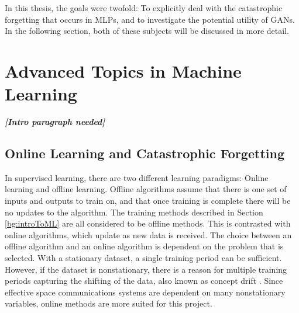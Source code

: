 	\par In this thesis, the goals were twofold: To explicitly deal with the catastrophic forgetting that occurs in MLPs, and to investigate the potential utility of GANs. In the following section, both of these subjects will be discussed in more detail.
	
	\section{Advanced Topics in Machine Learning}
	\par \textbf{\textit{[Intro paragraph needed]}}
	\subsection{Online Learning and Catastrophic Forgetting}
	\par In supervised learning, there are two different learning paradigms: Online learning and offline learning. Offline algorithms assume that there is one set of inputs and outputs to train on, and that once training is complete there will be no updates to the algorithm. The training methods described in Section \ref{bg:introToML} are all considered to be offline methods. This is contrasted with online algorithms, which update as new data is received. The choice between an offline algorithm and an online algorithm is dependent on the problem that is selected. With a stationary dataset, a single training period can be sufficient. However, if the dataset is nonstationary, there is a reason for multiple training periods capturing the shifting of the data, also known as concept drift \cite{placeholderCitation}. Since effective space communications systems are dependent on many nonstationary variables, online methods are more suited for this project.
